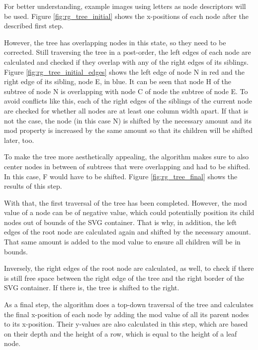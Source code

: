 For better understanding, example images using letters as node descriptors will be used. Figure \ref{fig:rg_tree_initial} shows the x-positions of each node after the described first step.

However, the tree has overlapping nodes in this state, so they need to be corrected. Still traversing the tree in a post-order, the left edges of each node are calculated and checked if they overlap with any of the right edges of its siblings. Figure \ref{fig:rg_tree_initial_edges} shows the left edge of node N in red and the right edge of its sibling, node E, in blue.
It can be seen that node H of the subtree of node N is overlapping with node C of node the subtree of node E. To avoid conflicts like this, each of the right edges of the siblings of the current node are checked for whether all nodes are at least one column width apart. If that is not the case, the node (in this case N) is shifted by the necessary amount and its mod property is increased by the same amount so that its children will be shifted later, too.

To make the tree more aesthetically appealing, the algorithm makes sure to also center nodes in between of subtrees that were overlapping and had to be shifted. In this case, F would have to be shifted. Figure \ref{fig:rg_tree_final} shows the results of this step.

With that, the first traversal of the tree has been completed. However, the mod value of a node can be of negative value, which could potentially position its child nodes out of bounds of the SVG container. That is why, in addition, the left edges of the root node are calculated again and shifted by the necessary amount. That same amount is added to the mod value to ensure all children will be in bounds.

Inversely, the right edges of the root node are calculated, as well, to check if there is still free space between the right edge of the tree and the right border of the SVG container. If there is, the tree is shifted to the right.

As a final step, the algorithm does a top-down traversal of the tree and calculates the final x-position of each node by adding the mod value of all its parent nodes to its x-position. Their y-values are also calculated in this step, which are based on their depth and the height of a row, which is equal to the height of a leaf node. 

